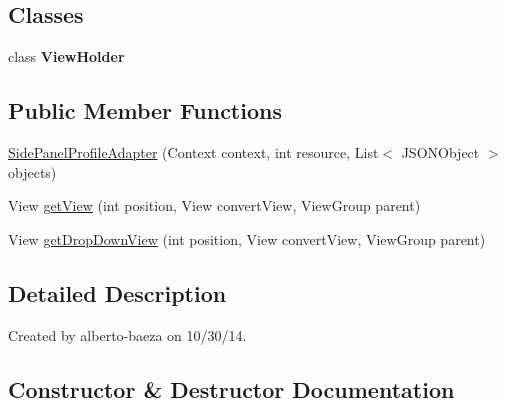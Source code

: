 \subsection*{Classes}
\begin{DoxyCompactItemize}
\item 
class {\bfseries View\+Holder}
\end{DoxyCompactItemize}
\subsection*{Public Member Functions}
\begin{DoxyCompactItemize}
\item 
\hyperlink{classandroid_1_1app_1_1printerapp_1_1viewer_1_1sidepanel_1_1_side_panel_profile_adapter_a9f733b4469d68cf1f825270f2036055a}{Side\+Panel\+Profile\+Adapter} (Context context, int resource, List$<$ J\+S\+O\+N\+Object $>$ objects)
\item 
View \hyperlink{classandroid_1_1app_1_1printerapp_1_1viewer_1_1sidepanel_1_1_side_panel_profile_adapter_a6b511388f04b34fc38bec2f1e771fc36}{get\+View} (int position, View convert\+View, View\+Group parent)
\item 
View \hyperlink{classandroid_1_1app_1_1printerapp_1_1viewer_1_1sidepanel_1_1_side_panel_profile_adapter_a2eeddaa810d737f417946f077afcb5d0}{get\+Drop\+Down\+View} (int position, View convert\+View, View\+Group parent)
\end{DoxyCompactItemize}


\subsection{Detailed Description}
Created by alberto-\/baeza on 10/30/14. 

\subsection{Constructor \& Destructor Documentation}
\mbox{\label{classandroid_1_1app_1_1printerapp_1_1viewer_1_1sidepanel_1_1_side_panel_profile_adapter_a9f733b4469d68cf1f825270f2036055a}} 
